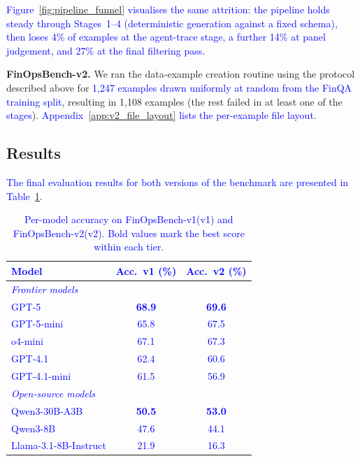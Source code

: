 \documentclass[11pt]{article}
\newcommand{\edit}[1]{\textcolor{blue}{#1}}
\newcommand{\editN}[1]{\textcolor{editgreen}{#1}}
\newcommand{\synthsubset}{FinOpsBench-v1}\xspace
\newcommand{\groundedfinqa}{FinOpsBench-v2}\xspace
\begin{document}
\edit{Figure~\ref{fig:pipeline_funnel} visualises the same attrition: the pipeline holds steady through Stages~1--4 (deterministic generation against a fixed schema), then loses 4\% of examples at the agent-trace stage, a further 14\% at 
\editN{panel}
judgement, and 27\% at the final filtering pass.}


\noindent \textbf{\groundedfinqa.} We ran the data-example creation routine using the protocol described above for \edit{1,247 examples drawn uniformly at random from the FinQA training split}, resulting in 1,108 examples (the rest failed in at least one of the \edit{stages}). \edit{Appendix~\ref{app:v2_file_layout} lists the per-example file layout.}

\subsection{Results}

\edit{The final evaluation results for both versions of the benchmark are presented in Table~\ref{tab:results}.}

\edit{\begin{table}[h]
\centering
\small
\setlength{\tabcolsep}{5pt}
\begin{tabular}{lcc}
\toprule
\textbf{Model} & \textbf{Acc.\ v1 (\%)} & \textbf{Acc.\ v2 (\%)} \\
\midrule
\multicolumn{3}{l}{\textit{Frontier models}} \\
GPT-5         & \textbf{68.9} & \textbf{69.6} \\
GPT-5-mini    & 65.8 & 67.5 \\
o4-mini       & 67.1 & 67.3 \\
GPT-4.1       & 62.4 & 60.6 \\
GPT-4.1-mini  & 61.5 & 56.9 \\
\midrule
\multicolumn{3}{l}{\textit{Open-source models}} \\
Qwen3-30B-A3B          & \textbf{50.5} & \textbf{53.0} \\
Qwen3-8B               & 47.6 & 44.1 \\
Llama-3.1-8B-Instruct  & 21.9 & 16.3 \\
\bottomrule
\end{tabular}
\caption{Per-model accuracy on \synthsubset (v1) and \groundedfinqa (v2). Bold values mark the best score within each tier.}
\label{tab:results}
\end{table}}
\end{document}
